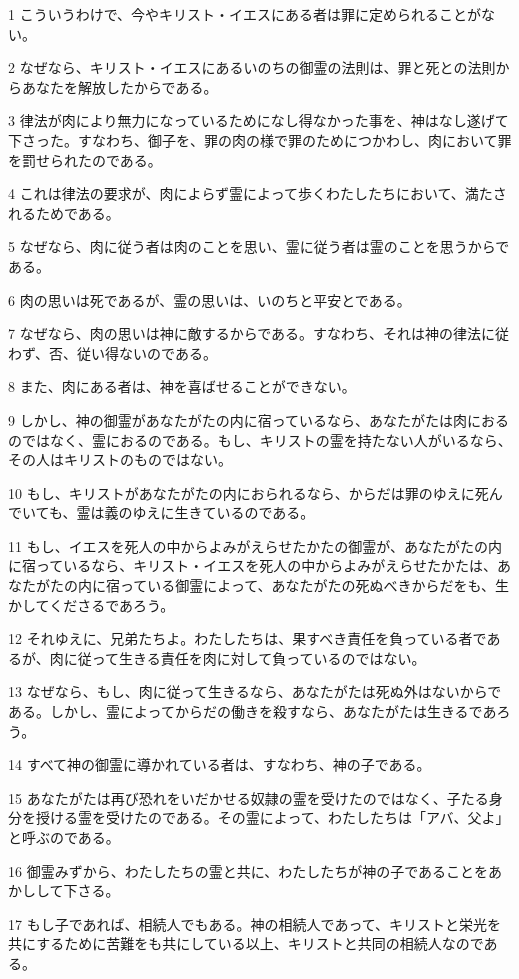\par 1 こういうわけで、今やキリスト・イエスにある者は罪に定められることがない。
\par 2 なぜなら、キリスト・イエスにあるいのちの御霊の法則は、罪と死との法則からあなたを解放したからである。
\par 3 律法が肉により無力になっているためになし得なかった事を、神はなし遂げて下さった。すなわち、御子を、罪の肉の様で罪のためにつかわし、肉において罪を罰せられたのである。
\par 4 これは律法の要求が、肉によらず霊によって歩くわたしたちにおいて、満たされるためである。
\par 5 なぜなら、肉に従う者は肉のことを思い、霊に従う者は霊のことを思うからである。
\par 6 肉の思いは死であるが、霊の思いは、いのちと平安とである。
\par 7 なぜなら、肉の思いは神に敵するからである。すなわち、それは神の律法に従わず、否、従い得ないのである。
\par 8 また、肉にある者は、神を喜ばせることができない。
\par 9 しかし、神の御霊があなたがたの内に宿っているなら、あなたがたは肉におるのではなく、霊におるのである。もし、キリストの霊を持たない人がいるなら、その人はキリストのものではない。
\par 10 もし、キリストがあなたがたの内におられるなら、からだは罪のゆえに死んでいても、霊は義のゆえに生きているのである。
\par 11 もし、イエスを死人の中からよみがえらせたかたの御霊が、あなたがたの内に宿っているなら、キリスト・イエスを死人の中からよみがえらせたかたは、あなたがたの内に宿っている御霊によって、あなたがたの死ぬべきからだをも、生かしてくださるであろう。
\par 12 それゆえに、兄弟たちよ。わたしたちは、果すべき責任を負っている者であるが、肉に従って生きる責任を肉に対して負っているのではない。
\par 13 なぜなら、もし、肉に従って生きるなら、あなたがたは死ぬ外はないからである。しかし、霊によってからだの働きを殺すなら、あなたがたは生きるであろう。
\par 14 すべて神の御霊に導かれている者は、すなわち、神の子である。
\par 15 あなたがたは再び恐れをいだかせる奴隷の霊を受けたのではなく、子たる身分を授ける霊を受けたのである。その霊によって、わたしたちは「アバ、父よ」と呼ぶのである。
\par 16 御霊みずから、わたしたちの霊と共に、わたしたちが神の子であることをあかしして下さる。
\par 17 もし子であれば、相続人でもある。神の相続人であって、キリストと栄光を共にするために苦難をも共にしている以上、キリストと共同の相続人なのである。
